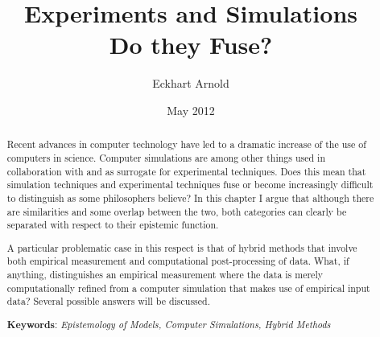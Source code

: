 \documentclass[12pt, a4paper]{article}
\numberwithin{equation}{section}
\begin{document}
 

%

\title{Experiments and Simulations\\Do they Fuse?}


%
\author{Eckhart Arnold}
%
%
%
\date{May 2012}
 
\maketitle

\begin{abstract}

Recent advances in computer technology have led to a dramatic increase of the use of computers in science. Computer simulations are among other things used in collaboration with and as surrogate for experimental techniques. Does this mean that simulation techniques and experimental techniques fuse or become increasingly difficult to distinguish as some philosophers believe? In this chapter I argue that although there are similarities and some overlap between the two, both categories can clearly be separated with respect to their epistemic function. 

A particular problematic case in this respect is that of hybrid methods that involve both empirical measurement and computational post-processing of data. What, if anything, distinguishes an empirical measurement where the data is merely computationally refined from a computer simulation that makes use of empirical input data? Several possible answers will be discussed. 


{\bf Keywords}: {\em Epistemology of Models, Computer Simulations, Hybrid Methods}

\end{abstract}

\newpage

\end{document}

